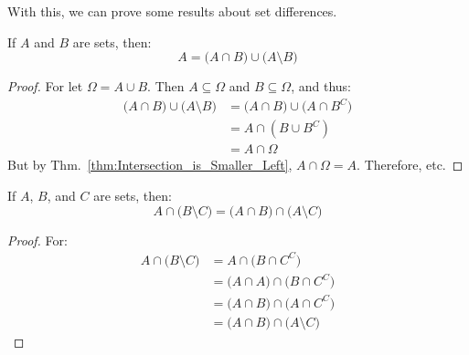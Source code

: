         With this, we can prove some results about
        set differences.
        \begin{theorem}
            If $A$ and $B$ are sets, then:
            \begin{equation}
                A=\big(A\cap{B}\big)
                    \cup\big(A\setminus{B}\big)
            \end{equation}
        \end{theorem}
        \begin{proof}
            For let $\Omega=A\cup{B}$. Then
            $A\subseteq\Omega$ and $B\subseteq\Omega$,
            and thus:
            \begin{subequations}
                \begin{align}
                    \big(A\cap{B})\cup\big(A\setminus{B}\big)
                    &=\big(A\cap{B}\big)
                        \cup\big(A\cap{B}^{C}\big)\\
                    &=A\cap(B\cup{B}^{C})\\
                    &=A\cap\Omega
                \end{align}
            \end{subequations}
            But by Thm.~\ref{thm:Intersection_is_Smaller_Left},
            $A\cap\Omega=A$. Therefore, etc.
        \end{proof}
        \begin{theorem}
            If $A$, $B$, and $C$ are sets, then:
            \begin{equation}
                A\cap\big(B\setminus{C}\big)
                =\big(A\cap{B}\big)\cap\big(A\setminus{C}\big)
            \end{equation}
        \end{theorem}
        \begin{proof}
            For:
            \begin{subequations}
                \begin{align}
                    A\cap\big(B\setminus{C}\big)
                    &=A\cap\big(B\cap{C}^{C}\big)\\
                    &=\big(A\cap{A}\big)
                        \cap\big(B\cap{C}^{C}\big)\\
                    &=\big(A\cap{B}\big)
                        \cap\big(A\cap{C}^{C}\big)\\
                    &=\big(A\cap{B}\big)
                        \cap\big(A\setminus{C}\big)
                \end{align}
            \end{subequations}
        \end{proof}
